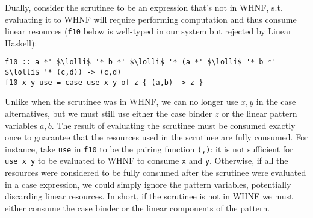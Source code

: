 \documentclass[acmsmall,review,screen]{acmart}
\newcommand{\incode}[1]{\lstinline{#1}}
\newcommand{\lolli}{\multimap}
\begin{document}
Dually, consider the scrutinee to be an expression that's not in WHNF, s.t.
evaluating it to WHNF will require performing computation and thus consume linear
resources (\incode{f10} below is well-typed in our system but rejected
by Linear Haskell):
\begin{notyet}
\begin{lstlisting}
f10 :: a *' $\lolli$ '* b *' $\lolli$ '* (a *' $\lolli$ '* b *' $\lolli$ '* (c,d)) -> (c,d)
f10 x y use = case use x y of z { (a,b) -> z }
\end{lstlisting}
\end{notyet}
Unlike when the scrutinee was in WHNF, we can no longer use $x,y$ in the case
alternatives, but we must still use either the case binder $z$ or the linear
pattern variables $a,b$. %
%
%
The result of evaluating the scrutinee must be consumed exactly once to guarantee
that the resources used in the scrutinee are fully consumed. %
For instance, take
\incode{use} in \incode{f10} to be the pairing function \incode{(,)}: it is not sufficient for \incode{use x y} to be
evaluated to WHNF to consume \incode{x} and \incode{y}. Otherwise, if all the resources were
considered to be fully consumed after the scrutinee were evaluated in a case
expression, we could simply ignore the pattern variables, potentially
discarding linear resources. In
short, if the scrutinee is not in WHNF we must either consume the case binder
or the linear components of the pattern.
\end{document}

